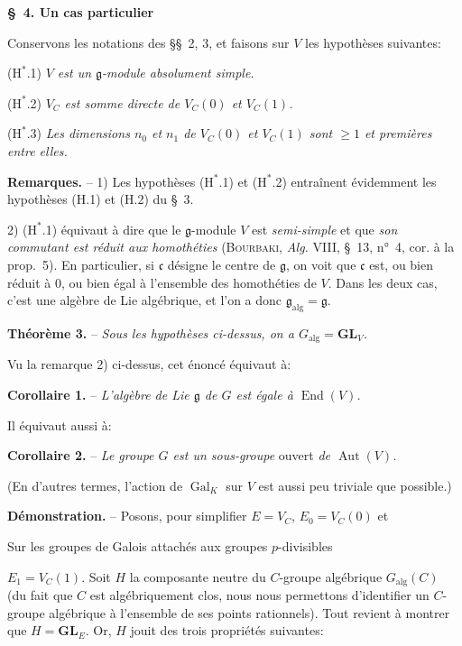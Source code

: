 \begin{center}\textbf{\S~4. Un cas particulier}\end{center}

Conservons les notations des \S\S~2, 3, et faisons sur $V$ les hypothèses suivantes:

($\mathrm{H}^{*}$.1) \textit{$V$ est un $\mathfrak{g}$-module absolument simple.}

($\mathrm{H}^{*}$.2) \textit{$V_C$ est somme directe de $V_C(0)$ et $V_C(1)$.}

($\mathrm{H}^{*}$.3) \textit{Les dimensions $n_0$ et $n_1$ de $V_C(0)$ et $V_C(1)$ sont $\geqslant 1$ et premières entre elles.}

\textbf{Remarques.} -- 1) Les hypothèses ($\mathrm{H}^{*}$.1) et ($\mathrm{H}^{*}$.2) entraînent évidemment les hypothèses (H.1) et (H.2) du \S~3.

2) ($\mathrm{H}^{*}$.1) équivaut à dire que le $\mathfrak{g}$-module $V$ est \textit{semi-simple} et que \textit{son commutant est réduit aux homothéties} (\textsc{Bourbaki}, \textit{Alg.} VIII, \S~13, n°~4, cor. à la prop.~5). En particulier, si $\mathfrak{c}$ désigne le centre de $\mathfrak{g}$, on voit que $\mathfrak{c}$ est, ou bien réduit à $0$, ou bien égal à l’ensemble des homothéties de $V$. Dans les deux cas, c’est une algèbre de Lie algébrique, et l’on a donc $\mathfrak{g}_{\mathrm{alg}}=\mathfrak{g}$.

\textbf{Théorème 3.} -- \textit{Sous les hypothèses ci-dessus, on a $G_{\mathrm{alg}}=\mathbf{GL}_V$.}

Vu la remarque 2) ci-dessus, cet énoncé équivaut à:

\textbf{Corollaire 1.} -- \textit{L’algèbre de Lie $\mathfrak{g}$ de $G$ est égale à $\operatorname{End}(V)$.}

Il équivaut aussi à:

\textbf{Corollaire 2.} -- \textit{Le groupe $G$ est un sous-groupe} ouvert \textit{de $\operatorname{Aut}(V)$.}

(En d’autres termes, l’action de $\operatorname{Gal}_K$ sur $V$ est aussi peu triviale que possible.)

\textbf{Démonstration.} -- Posons, pour simplifier $E=V_C$, $E_0=V_C(0)$ et
\begin{center}\small Sur les groupes de Galois attachés aux groupes $p$-divisibles\end{center}
$E_1=V_C(1)$. Soit $H$ la composante neutre du $C$-groupe algébrique $G_{\mathrm{alg}}(C)$ (du fait que $C$ est algébriquement clos, nous nous permettons d’identifier un $C$-groupe algébrique à l’ensemble de ses points rationnels). Tout revient à montrer que $H=\mathbf{GL}_E$. Or, $H$ jouit des trois propriétés suivantes:

